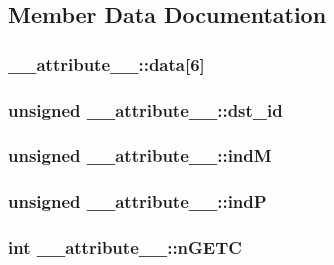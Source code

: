 \subsection{Member Data Documentation}
\hypertarget{struct____attribute_____acd2f8e99683824500bedfcabf34fd4f9}{
\subsubsection[{data}]{ {\bf \_\-\_\-attribute\_\-\_\-::data}\mbox{[}6\mbox{]}}}
\label{struct____attribute_____acd2f8e99683824500bedfcabf34fd4f9}
\hypertarget{struct____attribute_____abffd4da5aef1ba4854e7a81d14f86864}{
\subsubsection[{dst\_\-id}]{\setlength{\rightskip}{0pt plus 5cm}unsigned {\bf \_\-\_\-attribute\_\-\_\-::dst\_\-id}}}
\label{struct____attribute_____abffd4da5aef1ba4854e7a81d14f86864}
\hypertarget{struct____attribute_____a215d68d123f74d9c49d41e3f21cc84ed}{
\subsubsection[{indM}]{\setlength{\rightskip}{0pt plus 5cm}unsigned {\bf \_\-\_\-attribute\_\-\_\-::indM}}}
\label{struct____attribute_____a215d68d123f74d9c49d41e3f21cc84ed}
\hypertarget{struct____attribute_____aebaa365507fa4ca28d858516a653e5a7}{
\subsubsection[{indP}]{\setlength{\rightskip}{0pt plus 5cm}unsigned {\bf \_\-\_\-attribute\_\-\_\-::indP}}}
\label{struct____attribute_____aebaa365507fa4ca28d858516a653e5a7}
\hypertarget{struct____attribute_____a308fce32ca5f5670acc3f8d2073ab32d}{
\subsubsection[{nGETC}]{\setlength{\rightskip}{0pt plus 5cm}int {\bf \_\-\_\-attribute\_\-\_\-::nGETC}}}
